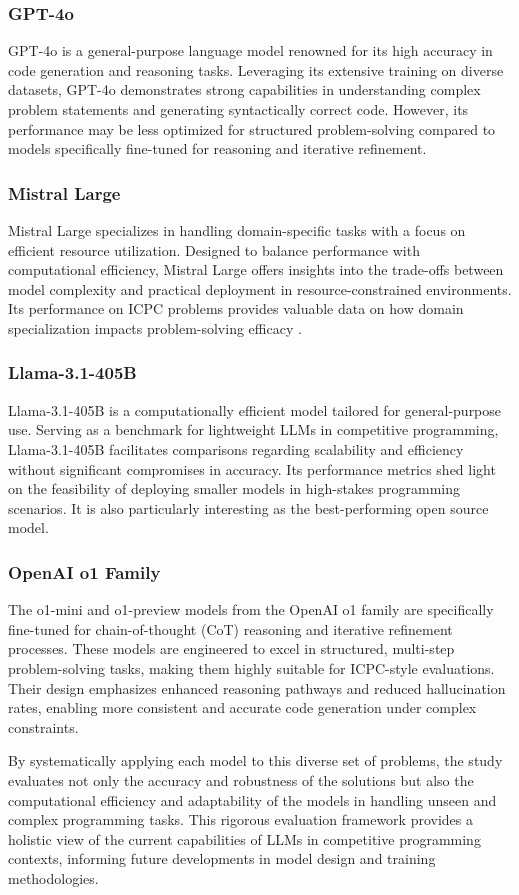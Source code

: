 \subsubsection{GPT-4o}
GPT-4o \cite{b27,b11,b26} is a general-purpose language model renowned for its high accuracy in code generation and reasoning tasks. Leveraging its extensive training on diverse datasets, GPT-4o\cite{Extending} demonstrates strong capabilities in understanding complex problem statements and generating syntactically correct code. However, its performance may be less optimized for structured problem-solving compared to models specifically fine-tuned for reasoning and iterative refinement.

\subsubsection{Mistral Large}
Mistral Large specializes in handling domain-specific tasks with a focus on efficient resource utilization. Designed to balance performance with computational efficiency, Mistral Large offers insights into the trade-offs between model complexity and practical deployment in resource-constrained environments. Its performance on ICPC problems provides valuable data on how domain specialization impacts problem-solving efficacy \cite{b13}.

\subsubsection{Llama-3.1-405B}
Llama-3.1-405B \cite{b27,b12} is a computationally efficient model tailored for general-purpose use. Serving as a benchmark for lightweight LLMs in competitive programming, Llama-3.1-405B facilitates comparisons regarding scalability and efficiency without significant compromises in accuracy. Its performance metrics shed light on the feasibility of deploying smaller models in high-stakes programming scenarios. It is also particularly interesting as the best-performing open source model.

\subsubsection{OpenAI o1 Family}
The o1-mini and o1-preview models \cite{b4,b10} from the OpenAI o1 family are specifically fine-tuned for chain-of-thought (CoT) reasoning and iterative refinement processes. These models are engineered to excel in structured, multi-step problem-solving tasks, making them highly suitable for ICPC-style evaluations. Their design emphasizes enhanced reasoning pathways and reduced hallucination rates, enabling more consistent and accurate code generation under complex constraints.

By systematically applying each model to this diverse set of problems, the study evaluates not only the accuracy and robustness of the solutions but also the computational efficiency and adaptability of the models in handling unseen and complex programming tasks. This rigorous evaluation framework provides a holistic view of the current capabilities of LLMs in competitive programming contexts, informing future developments in model design and training methodologies.
